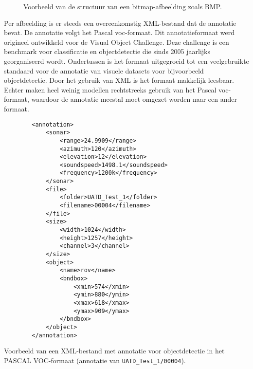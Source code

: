 \begin{figure}[H]
    \caption[Voorbeeld van een bitmap.]{\label{fig:bitmap_example_image}Voorbeeld van de structuur van een bitmap-afbeelding zoals BMP.}
\end{figure}

Per afbeelding is er steeds een overeenkomstig XML-bestand dat de annotatie bevat. De annotatie volgt het Pascal \acrshort{voc}-formaat. Dit annotatieformaat werd origineel ontwikkeld voor de Visual Object Challenge. Deze challenge is een benchmark voor classificatie en objectdetectie die sinds 2005 jaarlijks georganiseerd wordt. Ondertussen is het formaat uitgegroeid tot een veelgebruikte standaard voor de annotatie van visuele datasets voor bijvoorbeeld objectdetectie. Door het gebruik van XML is het formaat makkelijk leesbaar. Echter maken heel weinig modellen rechtstreeks gebruik van het Pascal \acrshort{voc}-formaat, waardoor de annotatie meestal moet omgezet worden naar een ander formaat. \autocite{Everingham_2009}

\clearpage

\begin{listing}[H]
    \begin{verbatim}
        <annotation>
            <sonar>
                <range>24.9909</range>
                <azimuth>120</azimuth>
                <elevation>12</elevation>
                <soundspeed>1498.1</soundspeed>
                <frequency>1200k</frequency>
            </sonar>
            <file>
                <folder>UATD_Test_1</folder>
                <filename>00004</filename>
            </file>
            <size>
                <width>1024</width>
                <height>1257</height>
                <channel>3</channel>
            </size>
            <object>
                <name>rov</name>
                <bndbox>
                    <xmin>574</xmin>
                    <ymin>880</ymin>
                    <xmax>618</xmax>
                    <ymax>909</ymax>
                </bndbox>
            </object>
        </annotation>
    \end{verbatim}
    \caption[PASCAL VOC-annotatie]{Voorbeeld van een XML-bestand met annotatie voor objectdetectie in het PASCAL VOC-formaat (annotatie van \texttt{UATD\_Test\_1/00004}). \autocite{Xie_2022}}
\end{listing}


